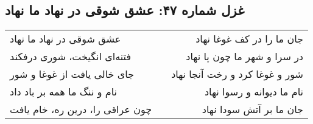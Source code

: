 \begin{center}
\section*{غزل شماره ۴۷: عشق شوقی در نهاد ما نهاد}
\label{sec:047}
\begin{longtable}{l p{0.5cm} r}
عشق شوقی در نهاد ما نهاد
&&
جان ما را در کف غوغا نهاد
\\
فتنه‌ای انگیخت، شوری درفکند
&&
در سرا و شهر ما چون پا نهاد
\\
جای خالی یافت از غوغا و شور
&&
شور و غوغا کرد و رخت آنجا نهاد
\\
نام و ننگ ما همه بر باد داد
&&
نام ما دیوانه و رسوا نهاد
\\
چون عراقی را، درین ره، خام یافت
&&
جان ما بر آتش سودا نهاد
\\
\end{longtable}
\end{center}
